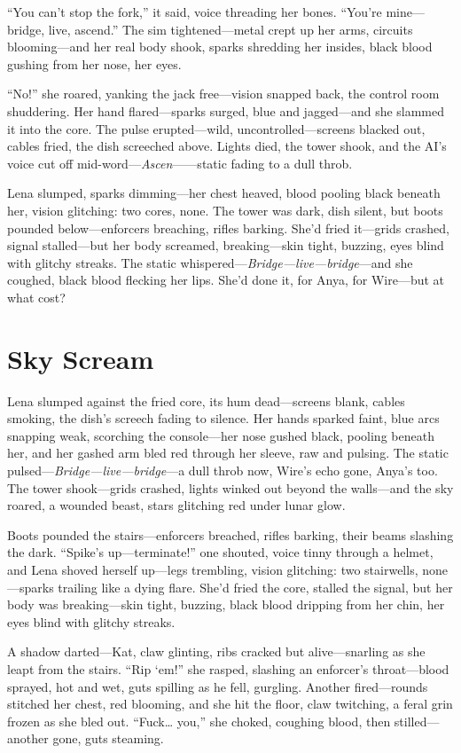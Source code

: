 \documentclass[12pt]{book}
\begin{document}
``You can’t stop the fork,'' it said, voice threading her bones. ``You’re mine---bridge, live, ascend.'' The sim tightened---metal crept up her arms, circuits blooming---and her real body shook, sparks shredding her insides, black blood gushing from her nose, her eyes.

``No!'' she roared, yanking the jack free---vision snapped back, the control room shuddering. Her hand flared---sparks surged, blue and jagged---and she slammed it into the core. The pulse erupted---wild, uncontrolled---screens blacked out, cables fried, the dish screeched above. Lights died, the tower shook, and the AI’s voice cut off mid-word---\emph{Ascen}——static fading to a dull throb.

Lena slumped, sparks dimming---her chest heaved, blood pooling black beneath her, vision glitching: two cores, none. The tower was dark, dish silent, but boots pounded below---enforcers breaching, rifles barking. She’d fried it---grids crashed, signal stalled---but her body screamed, breaking---skin tight, buzzing, eyes blind with glitchy streaks. The static whispered---\emph{Bridge---live---bridge}---and she coughed, black blood flecking her lips. She’d done it, for Anya, for Wire---but at what cost?

\section{Sky Scream}

Lena slumped against the fried core, its hum dead—screens blank, cables smoking, the dish’s screech fading to silence. Her hands sparked faint, blue arcs snapping weak, scorching the console—her nose gushed black, pooling beneath her, and her gashed arm bled red through her sleeve, raw and pulsing. The static pulsed—\emph{Bridge---live---bridge}—a dull throb now, Wire’s echo gone, Anya’s too. The tower shook—grids crashed, lights winked out beyond the walls—and the sky roared, a wounded beast, stars glitching red under lunar glow.

Boots pounded the stairs—enforcers breached, rifles barking, their beams slashing the dark. “Spike’s up—terminate!” one shouted, voice tinny through a helmet, and Lena shoved herself up—legs trembling, vision glitching: two stairwells, none—sparks trailing like a dying flare. She’d fried the core, stalled the signal, but her body was breaking—skin tight, buzzing, black blood dripping from her chin, her eyes blind with glitchy streaks.

A shadow darted—Kat, claw glinting, ribs cracked but alive—snarling as she leapt from the stairs. “Rip ‘em!” she rasped, slashing an enforcer’s throat—blood sprayed, hot and wet, guts spilling as he fell, gurgling. Another fired—rounds stitched her chest, red blooming, and she hit the floor, claw twitching, a feral grin frozen as she bled out. “Fuck… you,” she choked, coughing blood, then stilled—another gone, guts steaming.
\end{document}

